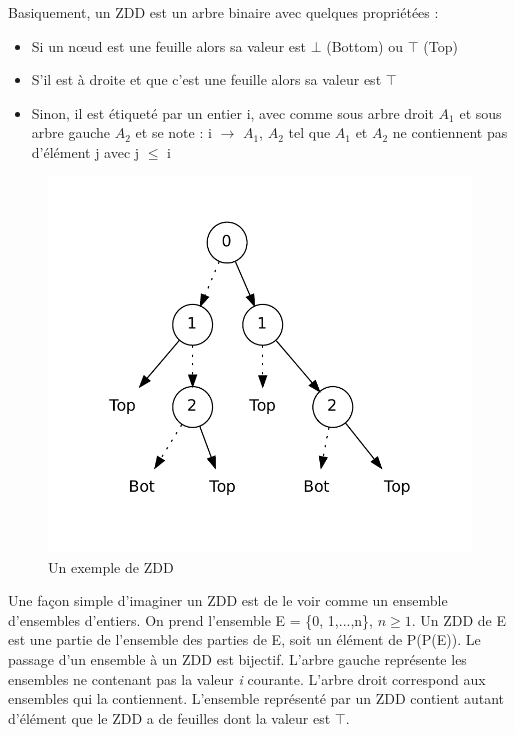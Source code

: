 \documentclass[a4paper]{article}
\begin{document}
Basiquement, un ZDD est un arbre binaire avec quelques propriétées : 

\begin{itemize}
\item Si un n\oe ud est une feuille alors sa valeur est $\bot$ (Bottom) ou 
$\top$ (Top)
\item S'il est à droite et que c'est une feuille alors sa valeur est $\top$
\item Sinon, il est étiqueté par un entier i, avec comme sous arbre droit 
$A_1$ et sous arbre gauche $A_2$ et se note : i $\rightarrow$ $A_1$, $A_2$ tel
que $A_1$ et $A_2$ ne contiennent pas d'élément j avec j $\leq$ i \\
\end{itemize} 

\begin{figure}[htp]
\begin{center}
\includegraphics[scale=0.4]{../imports/zdd_ex.pdf}
\end{center}
\caption{\label{fig:zdd_exemple} Un exemple de ZDD}
\end{figure}

Une façon simple d'imaginer un ZDD est de le voir comme un ensemble d'ensembles 
d'entiers. 
On prend l'ensemble E = \{0, 1,...,n\}, $n \geq 1$. Un ZDD de E est une partie de 
l'ensemble 
des parties de E, soit un élément de P(P(E)). Le passage d'un ensemble à un ZDD
est bijectif. L'arbre gauche représente les ensembles ne contenant 
pas la valeur
\emph{i} courante. L'arbre droit correspond aux ensembles qui la contiennent.
L'ensemble représenté par un ZDD contient autant d'élément que le ZDD 
a de feuilles 
dont la valeur est $\top$.
\end{document}
